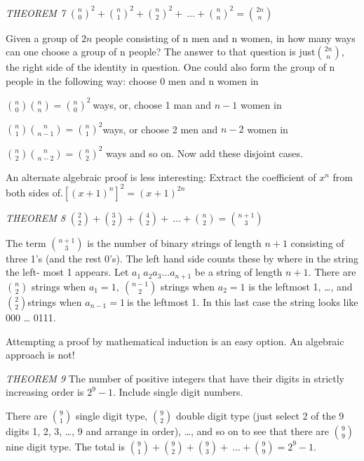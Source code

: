 \documentclass[10pt,letter]{article}
\begin{document}
\emph{THEOREM 7} \(\binom{n}{0}
^{2} +
\binom{n}{1}
^{2} +
\binom{n}{2}
^{2} + \ \ldots +
\binom{n}{n}
^{2} =
\binom{2n}{n}
\)

Given a group of \(2n\) people consisting of n men and n women, in how
many ways can one choose a group of n people? The answer to that
question is just\(\binom{2n}{n}
\), the right side of the identity in question. One could
also form the group of n people in the following way: choose 0 men and n
women in

\(\binom{n}{0}
\binom{n}{n}
 =
\binom{n}{0}
^{2}\ \)ways, or, choose 1 man and \(n - 1\) women in

\(\binom{n}{1}
\binom{n}{n - 1}
 =
\binom{n}{1}
^{2}\)ways, or choose 2 men and \(n - 2\) women in

\(\binom{n}{2}
\binom{n}{n - 2}
 =
\binom{n}{2}
^{2}\) ways and so on. Now add these disjoint cases.

An alternate algebraic proof is less interesting: Extract the
coefficient of \(x^{n}\) from both sides
of.\(\left\lbrack \left( x + 1 \right)^{n} \right\rbrack^{2} = \left( x + 1 \right)^{2n}\)

\emph{THEOREM 8} \(\binom{2}{2}
 +
\binom{3}{2}
 +
\binom{4}{2}
 + \ \ldots +
\binom{n}{2}
 =
\binom{n + 1}{3}
\)

The term \(\binom{n + 1}{3}
\) is the number of binary strings of length \(n + 1\)
consisting of three 1's (and the rest 0's). The left hand side counts
these by where in the string the left- most 1 appears. Let
\(a_{1}\ a_{2}a_{3}\ldots a_{n + 1}\) be a string of length \(n + 1\).
There are \(\binom{n}{2}
\) strings when \(a_{1} = 1,\
\binom{n - 1}{2}
\) strings when \(a_{2} = 1\) is the leftmost 1, \ldots{},
and \(\binom{2}{2}
\)strings when \(a_{n - 1} = 1\ \)is the leftmost 1. In
this last case the string looks like 000 \ldots{} 0111.

Attempting a proof by mathematical induction is an easy option. An
algebraic approach is not!

\emph{THEOREM 9} The number of positive integers that have their digits
in strictly increasing order is \(2^{9} - 1\). Include single digit
numbers.

There are \(\binom{9}{1}
\) single digit type, \(\binom{9}{2}
\) double digit type (just select 2 of the 9 digits 1, 2,
3, \ldots{}, 9 and arrange in order), \ldots{}, and so on to see that
there are \(\binom{9}{9}
\) nine digit type. The total is \(\binom{9}{1}
 +
\binom{9}{2}
 +
\binom{9}{3}
 + \ \ldots +
\binom{9}{9}
 = 2^{9} - 1.\)
\end{document}
